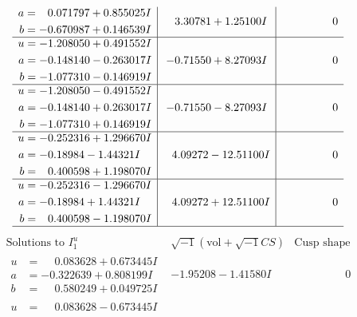 \documentclass[1p]{elsarticle_modified}
\theoremstyle{definition}
\newcommand{\I}{\sqrt{-1}}
\begin{document}
$$\begin{array}{c|c|c}
\begin{aligned}
a &= \phantom{-}0.071797 + 0.855025 I \\
b &= -0.670987 + 0.146539 I\end{aligned}
 & \phantom{-}3.30781 + 1.25100 I & \phantom{-0.000000 } 0 \\ \hline\begin{aligned}
u &= -1.208050 + 0.491552 I \\
a &= -0.148140 - 0.263017 I \\
b &= -1.077310 - 0.146919 I\end{aligned}
 & -0.71550 + 8.27093 I & \phantom{-0.000000 } 0 \\ \hline\begin{aligned}
u &= -1.208050 - 0.491552 I \\
a &= -0.148140 + 0.263017 I \\
b &= -1.077310 + 0.146919 I\end{aligned}
 & -0.71550 - 8.27093 I & \phantom{-0.000000 } 0 \\ \hline\begin{aligned}
u &= -0.252316 + 1.296670 I \\
a &= -0.18984 - 1.44321 I \\
b &= \phantom{-}0.400598 + 1.198070 I\end{aligned}
 & \phantom{-}4.09272 - 12.51100 I & \phantom{-0.000000 } 0 \\ \hline\begin{aligned}
u &= -0.252316 - 1.296670 I \\
a &= -0.18984 + 1.44321 I \\
b &= \phantom{-}0.400598 - 1.198070 I\end{aligned}
 & \phantom{-}4.09272 + 12.51100 I & \phantom{-0.000000 } 0\\
 \hline 
 \end{array}$$\newpage$$\begin{array}{c|c|c}  
\text{Solutions to }I^u_{1}& \I (\text{vol} + \sqrt{-1}CS) & \text{Cusp shape}\\
 \hline 
\begin{aligned}
u &= \phantom{-}0.083628 + 0.673445 I \\
a &= -0.322639 + 0.808199 I \\
b &= \phantom{-}0.580249 + 0.049725 I\end{aligned}
 & -1.95208 - 1.41580 I & \phantom{-0.000000 } 0 \\ \hline\begin{aligned}
u &= \phantom{-}0.083628 - 0.673445 I \\

\end{aligned}
\end{array}$$
\end{document}
